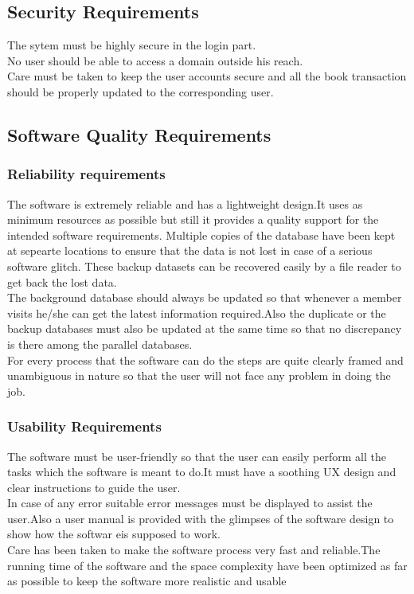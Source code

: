 \documentclass{article}
\begin{document}
\subsection{Security Requirements}
The sytem must be highly secure in the login part.\\
No user should be able to access a domain outside his reach.\\
Care must be taken to keep the user accounts secure and all the book transaction should be properly updated to the corresponding user.\\

\subsection{Software Quality Requirements}
\subsubsection{Reliability requirements}
The software is extremely reliable and has a lightweight design.It uses as minimum resources as possible but still it provides a quality support for the intended software requirements.
Multiple copies of the database have been kept at sepearte locations to ensure that the data is not lost in case of a serious software glitch. These backup datasets can be recovered easily by a file reader to get back the lost data.
\\
The background database should always be updated so that whenever a member visits he/she can get the latest information required.Also the duplicate or the backup databases must also be updated at the same time so that no discrepancy is there among the parallel databases.
\\
For every process that the software can do the steps are quite clearly framed and unambiguous in nature so that the user will not face any problem in doing the job.
\subsubsection{Usability Requirements}
The software must be user-friendly so that the user can easily perform all the tasks which the software is meant to do.It must have a soothing UX design and clear instructions to guide the user.
\\In case of any error suitable error messages must be displayed to assist the user.Also a user manual is provided with the glimpses of the software design to show how the softwar eis supposed to work.
\\
Care has been taken to make the software process very fast and reliable.The running time of the software and the space complexity have been optimized as far as possible to keep the software more realistic and usable
\end{document}
